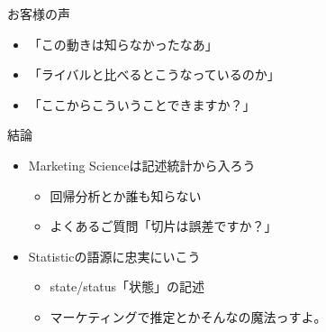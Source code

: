 \documentclass[ignorenonframetext,]{beamer}
\providecommand{\tightlist}{%
  \setlength{\itemsep}{0pt}\setlength{\parskip}{0pt}}
\begin{document}
\begin{frame}{お客様の声}

\begin{itemize}
\tightlist
\item
  「この動きは知らなかったなあ」
\item
  「ライバルと比べるとこうなっているのか」
\item
  「ここからこういうことできますか？」
\end{itemize}

\end{frame}

\begin{frame}{結論}

\begin{itemize}
\tightlist
\item
  Marketing Scienceは記述統計から入ろう

  \begin{itemize}
  \tightlist
  \item
    回帰分析とか誰も知らない
  \item
    よくあるご質問「切片は誤差ですか？」
  \end{itemize}
\item
  Statisticの語源に忠実にいこう

  \begin{itemize}
  \tightlist
  \item
    state/status「状態」の記述
  \item
    マーケティングで推定とかそんなの魔法っすよ。
  \end{itemize}
\end{itemize}

\end{frame}
\end{document}
